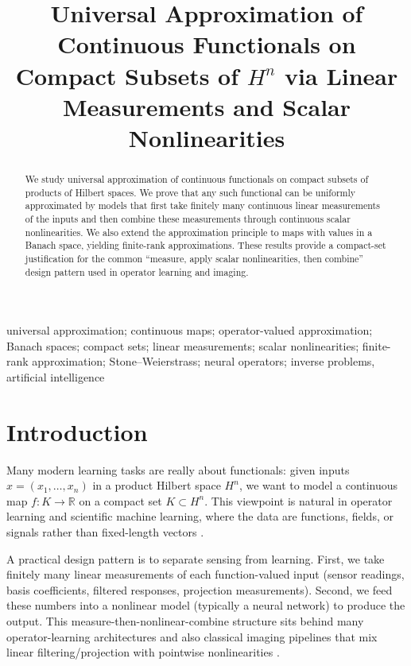\documentclass[final,12pt]{colt2026} %
\title[Universal Functionals Approximation]{Universal Approximation of Continuous Functionals on Compact Subsets of $H^n$ via Linear Measurements and Scalar Nonlinearities}
\begin{document}
\maketitle

\begin{abstract}%
We study universal approximation of continuous functionals on compact subsets of products of Hilbert spaces.
We prove that any such functional can be uniformly approximated by models that first take finitely many continuous linear measurements of the inputs and then combine these measurements through continuous scalar nonlinearities.
We also extend the approximation principle to maps with values in a Banach space, yielding finite-rank approximations.
These results provide a compact-set justification for the common ``measure, apply scalar nonlinearities, then combine'' design pattern used in operator learning and imaging.
\end{abstract}

\begin{keywords}%
  universal approximation; continuous maps; operator-valued approximation; Banach spaces; compact sets; linear measurements; scalar nonlinearities; finite-rank approximation; Stone--Weierstrass; neural operators; inverse problems, artificial intelligence%
\end{keywords}

\section{Introduction}
Many modern learning tasks are really about functionals: given inputs $x=(x_1,\dots,x_n)$ in a product Hilbert space $H^n$, we want to model a continuous map $f\colon K\to\mathbb{R}$ on a compact set $K\subset H^n$. This viewpoint is natural in operator learning and scientific machine learning, where the data are functions, fields, or signals rather than fixed-length vectors \cite{kovachki_neuraloperator,li_fno,lu_deeponet}.

A practical design pattern is to separate sensing from learning. First, we take finitely many linear measurements of each function-valued input (sensor readings, basis coefficients, filtered responses, projection measurements). Second, we feed these numbers into a nonlinear model (typically a neural network) to produce the output. This measure-then-nonlinear-combine structure sits behind many operator-learning architectures \cite{lu_deeponet,li_fno,kovachki_neuraloperator} and also classical imaging pipelines that mix linear filtering/projection with pointwise nonlinearities \cite{mallat_wavelet,ronneberger_unet,adler_oktem_learned}.
\end{document}
